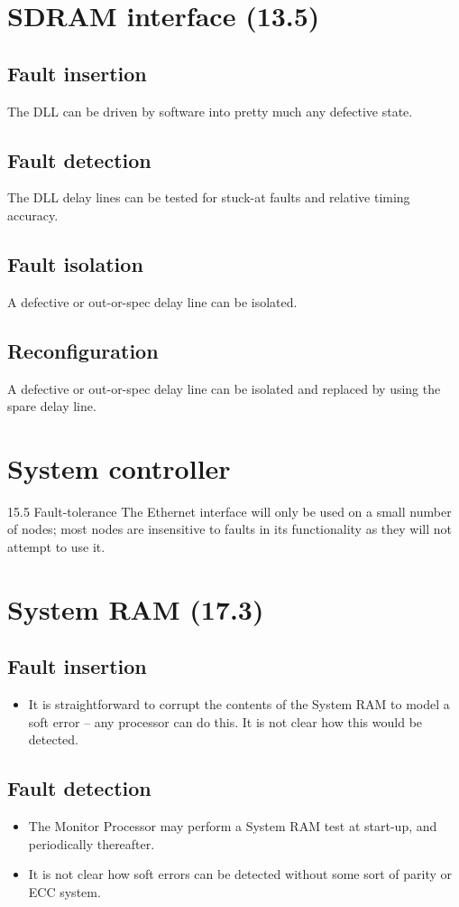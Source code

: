\documentclass[oneside, a4paper, 11pt]{memoir}
\newenvironment{itmz}{
	\begin{itemize}
		\setlength{\itemsep}{0pt}
		\setlength{\parskip}{0pt}
	}{\end{itemize}}
\begin{document}
\section{SDRAM interface (13.5)}
\subsection*{Fault insertion}
The DLL can be driven by software into pretty much any defective state.
\subsection*{Fault detection}
The DLL delay lines can be tested for stuck-at faults and relative timing accuracy.
\subsection*{Fault isolation}
A defective or out-or-spec delay line can be isolated.
\subsection*{Reconfiguration}
A defective or out-or-spec delay line can be isolated and replaced by using the spare delay line.

\section{System controller}
15.5 Fault-tolerance
The Ethernet interface will only be used on a small number of nodes; most nodes are insensitive to
faults in its functionality as they will not attempt to use it.

\section{System RAM (17.3)}
\subsection*{Fault insertion}
\begin{itmz}
\item It is straightforward to corrupt the contents of the System RAM to model a soft error -- any processor can do this. It is not clear how this would be detected.
\end{itmz}
\subsection*{Fault detection}
\begin{itmz}
\item The Monitor Processor may perform a System RAM test at start-up, and periodically thereafter.
\item It is not clear how soft errors can be detected without some sort of parity or ECC system.
\end{itmz}
\end{document}
